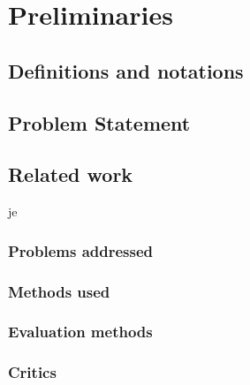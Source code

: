 
\chapter{Preliminaries} %

\label{Chapter2} %



\section{Definitions and notations}

\section{Problem Statement}




\section{Related work}
je \cite{1}
\subsection{Problems addressed}

\subsection{Methods used}

\subsection{Evaluation methods}

\subsection{Critics}


